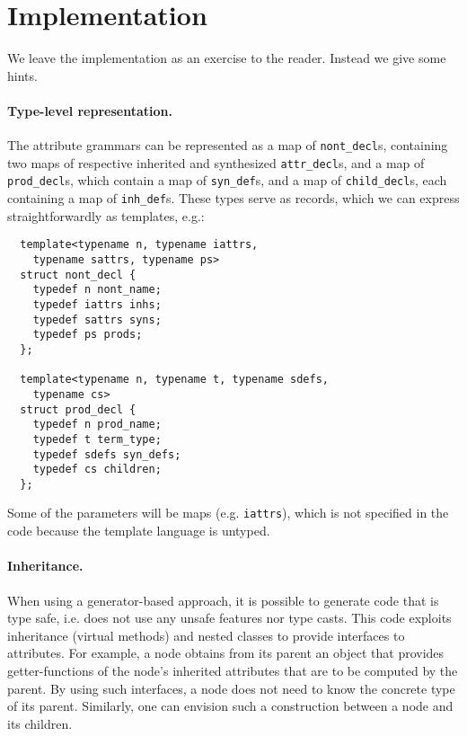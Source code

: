\documentclass{llncs}
\begin{document}
\section{Implementation}
\label{sec:implementation}

  We leave the implementation as an exercise
  to the reader. Instead we give some hints.

  \paragraph{Type-level representation.}
  The attribute grammars can be represented as a
  map of \lstinline$nont_decl$s, containing two maps
  of respective inherited and synthesized \lstinline$attr_decl$s,
  and a map of \lstinline$prod_decl$s, which contain
  a map of \lstinline$syn_def$s, and a map of \lstinline$child_decl$s,
  each containing a map of \lstinline$inh_def$s. These types
  serve as records, which we can express straightforwardly as templates,
  e.g.:
  \begin{lstlisting}
  template<typename n, typename iattrs,
    typename sattrs, typename ps>
  struct nont_decl {
    typedef n nont_name;
    typedef iattrs inhs;
    typedef sattrs syns;
    typedef ps prods;
  };

  template<typename n, typename t, typename sdefs,
    typename cs>
  struct prod_decl {
    typedef n prod_name;
    typedef t term_type;
    typedef sdefs syn_defs;
    typedef cs children;
  };
  \end{lstlisting}
  Some of the parameters will be maps (e.g. \lstinline$iattrs$), which
  is not specified in the code because the template language is untyped.

  \paragraph{Inheritance.}
  When using a generator-based approach, it is possible to
  generate code that is type safe, i.e. does not use any
  unsafe features nor type casts. This code exploits
  inheritance (virtual methods) and nested classes to provide interfaces
  to attributes. For example, a node obtains from its
  parent an object that provides getter-functions of
  the node's inherited attributes that are to be computed
  by the parent. By using such interfaces, a node does
  not need to know the concrete type of its parent.
  Similarly, one can envision such a construction between
  a node and its children.
  
\end{document}
